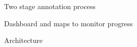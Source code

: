 \documentclass{beamer}
\begin{document}
\begin{frame}{Two stage annotation process}









\end{frame}



\begin{frame}{Dashboard and maps to monitor progress}


\end{frame}



\begin{frame}{Architecture}





\end{frame}
\end{document}
